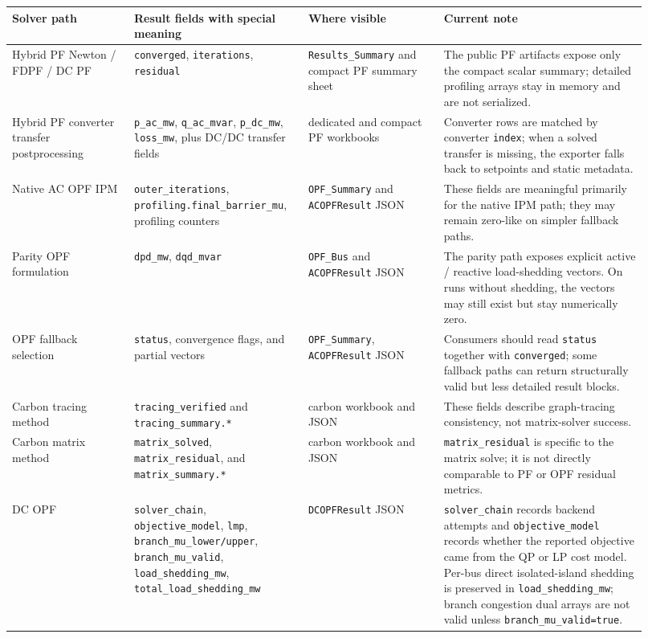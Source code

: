 \begin{longtable}{@{}L{0.18\linewidth}L{0.24\linewidth}L{0.20\linewidth}L{0.30\linewidth}@{}}
\toprule
Solver path & Result fields with special meaning & Where visible & Current note \\
\midrule
\endhead
Hybrid PF Newton / FDPF / DC PF & \texttt{converged}, \texttt{iterations}, \texttt{residual} & \texttt{Results\_Summary} and compact PF summary sheet & The public PF artifacts expose only the compact scalar summary; detailed profiling arrays stay in memory and are not serialized. \\
Hybrid PF converter transfer postprocessing & \texttt{p\_ac\_mw}, \texttt{q\_ac\_mvar}, \texttt{p\_dc\_mw}, \texttt{loss\_mw}, plus DC/DC transfer fields & dedicated and compact PF workbooks & Converter rows are matched by converter \texttt{index}; when a solved transfer is missing, the exporter falls back to setpoints and static metadata. \\
Native AC OPF IPM & \texttt{outer\_iterations}, \texttt{profiling.final\_barrier\_mu}, profiling counters & \texttt{OPF\_Summary} and \texttt{ACOPFResult} JSON & These fields are meaningful primarily for the native IPM path; they may remain zero-like on simpler fallback paths. \\
Parity OPF formulation & \texttt{dpd\_mw}, \texttt{dqd\_mvar} & \texttt{OPF\_Bus} and \texttt{ACOPFResult} JSON & The parity path exposes explicit active / reactive load-shedding vectors.  On runs without shedding, the vectors may still exist but stay numerically zero. \\
OPF fallback selection & \texttt{status}, convergence flags, and partial vectors & \texttt{OPF\_Summary}, \texttt{ACOPFResult} JSON & Consumers should read \texttt{status} together with \texttt{converged}; some fallback paths can return structurally valid but less detailed result blocks. \\
Carbon tracing method & \texttt{tracing\_verified} and \texttt{tracing\_summary.*} & carbon workbook and JSON & These fields describe graph-tracing consistency, not matrix-solver success. \\
Carbon matrix method & \texttt{matrix\_solved}, \texttt{matrix\_residual}, and \texttt{matrix\_summary.*} & carbon workbook and JSON & \texttt{matrix\_residual} is specific to the matrix solve; it is not directly comparable to PF or OPF residual metrics. \\
DC OPF & \texttt{solver\_chain}, \texttt{objective\_model}, \texttt{lmp}, \texttt{branch\_mu\_lower/upper}, \texttt{branch\_mu\_valid}, \texttt{load\_shedding\_mw}, \texttt{total\_load\_shedding\_mw} & \texttt{DCOPFResult} JSON & \texttt{solver\_chain} records backend attempts and \texttt{objective\_model} records whether the reported objective came from the QP or LP cost model.  Per-bus direct isolated-island shedding is preserved in \texttt{load\_shedding\_mw}; branch congestion dual arrays are not valid unless \texttt{branch\_mu\_valid=true}. \\

\end{longtable}
